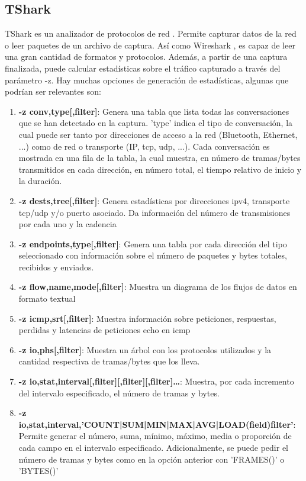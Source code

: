 \subsection{TShark}\label{tshark}

TShark es un analizador de protocolos de red \cite{tsharkmanual}. Permite capturar datos de la red o leer paquetes de un archivo de captura. Así como Wireshark \cite{wsharkmanual}, es capaz de leer una gran cantidad de formatos y protocolos. Además, a partir de una captura finalizada, puede calcular estadísticas sobre el tráfico capturado a través del parámetro -z. Hay muchas opciones de generación de estadísticas, algunas que podrían ser relevantes son:

\begin{enumerate} 
    \item \textbf{-z conv,type[,filter]}: Genera una tabla que lista todas las conversaciones que se han detectado en la captura. 'type' indica el tipo de conversación, la cual puede ser tanto por direcciones de acceso a la red (Bluetooth, Ethernet, ...) como de red o transporte (IP, \acrshort{tcp}, \acrshort{udp}, ...). Cada conversación es mostrada en una fila de la tabla, la cual muestra, en número de tramas/bytes transmitidos en cada dirección, en número total, el tiempo relativo de inicio y la duración.
    \item \textbf{-z dests,tree[,filter]}: Genera estadísticas por direcciones \acrshort{ipv4}, transporte \acrshort{tcp}/\acrshort{udp} y/o puerto asociado. Da información del número de transmisiones por cada uno y la cadencia
    \item \textbf{-z endpoints,type[,filter]}: Genera una tabla por cada dirección del tipo seleccionado con información sobre el número de paquetes y bytes totales, recibidos y enviados.
    \item \textbf{-z flow,name,mode[,filter]}: Muestra un diagrama de los flujos de datos en formato textual
    \item \textbf{-z icmp,srt[,filter]}: Muestra información sobre peticiones, respuestas, perdidas y latencias de peticiones echo en \acrshort{icmp}
    \item \textbf{-z io,phs[,filter]}: Muestra un árbol con los protocolos utilizados y la cantidad respectiva de tramas/bytes que los lleva.
    \item \textbf{-z io,stat,interval[,filter][,filter][,filter]…​}: Muestra, por cada incremento del intervalo especificado, el número de tramas y bytes. 
    \item \textbf{-z io,stat,interval,'COUNT|SUM|MIN|MAX|AVG|LOAD(field)filter'}: Permite generar el número, suma, mínimo, máximo, media o proporción de cada campo en el intervalo especificado. Adicionalmente, se puede pedir el número de tramas y bytes como en la opción anterior con 'FRAMES()' o 'BYTES()'

\end{enumerate}
